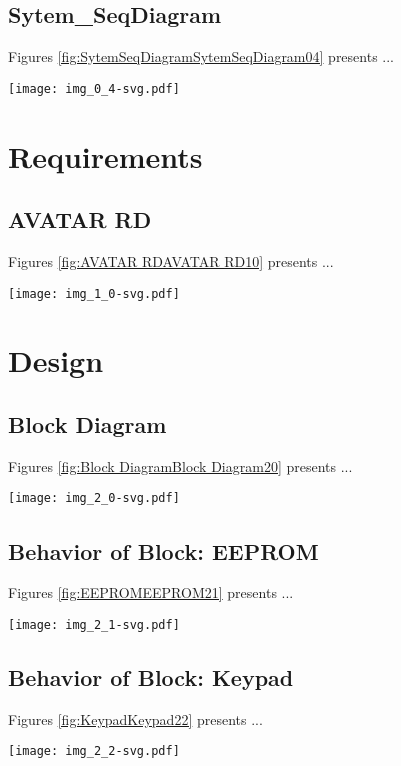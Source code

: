 \subsection{Sytem\_SeqDiagram}
Figures \ref{fig:SytemSeqDiagramSytemSeqDiagram04} presents ...
\begin{figure*}[htb]
\centering
\texttt{[image: img\_0\_4-svg.pdf]}
\caption{Diagram "Sytem\_SeqDiagram"}
\label{fig:SytemSeqDiagramSytemSeqDiagram04}
\end{figure*}

\section{Requirements}
\subsection{AVATAR RD}
Figures \ref{fig:AVATAR RDAVATAR RD10} presents ...
\begin{figure*}[htb]
\centering
\texttt{[image: img\_1\_0-svg.pdf]}
\caption{Diagram "AVATAR RD"}
\label{fig:AVATAR RDAVATAR RD10}
\end{figure*}

\section{Design}
\subsection{Block Diagram}
Figures \ref{fig:Block DiagramBlock Diagram20} presents ...
\begin{figure*}[htb]
\centering
\texttt{[image: img\_2\_0-svg.pdf]}
\caption{Diagram "Block Diagram"}
\label{fig:Block DiagramBlock Diagram20}
\end{figure*}

\subsection{Behavior of Block: EEPROM}
Figures \ref{fig:EEPROMEEPROM21} presents ...
\begin{figure*}[htb]
\centering
\texttt{[image: img\_2\_1-svg.pdf]}
\caption{Diagram "Behavior of Block: EEPROM"}
\label{fig:EEPROMEEPROM21}
\end{figure*}

\subsection{Behavior of Block: Keypad}
Figures \ref{fig:KeypadKeypad22} presents ...
\begin{figure*}[htb]
\centering
\texttt{[image: img\_2\_2-svg.pdf]}
\caption{Diagram "Behavior of Block: Keypad"}
\label{fig:KeypadKeypad22}
\end{figure*}

